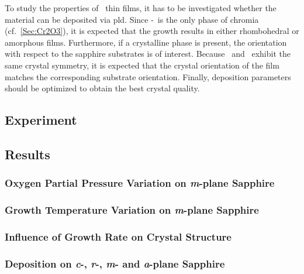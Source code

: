 To study the properties of \cro\ thin films, it has to be investigated whether the material can be deposited via \gls{pld}.
Since \textalpha-\cro\ is the only phase of chromia (cf.~\ref{Sec:Cr2O3}), it is expected that the growth results in either rhombohedral or amorphous films.
Furthermore, if a crystalline phase is present, the orientation with respect to the sapphire substrates is of interest.
Because \alo\ and \cro\ exhibit the same crystal symmetry, it is expected that the crystal orientation of the film  matches the corresponding substrate orientation.
Finally, deposition parameters should be optimized to obtain the best crystal quality.

\subsection{Experiment}
    

\subsection{Results}
    \subsubsection{Oxygen Partial Pressure Variation on \textit{m}-plane Sapphire}
        
    \subsubsection{Growth Temperature Variation on \textit{m}-plane Sapphire}
        
    \subsubsection{Influence of Growth Rate on Crystal Structure}
        
    \subsubsection{Deposition on \textit{c}-, \textit{r}-, \textit{m}- and \textit{a}-plane Sapphire}
        